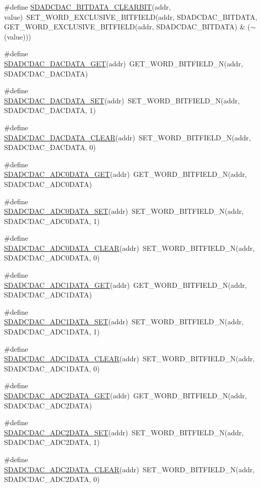 \begin{DoxyCompactItemize}
\item 
\#define \hyperlink{a00568_a17dc375efe6fac49a701ad12cfa22fe7}{SDADCDAC\_\-BITDATA\_\-CLEARBIT}(addr, value)~SET\_\-WORD\_\-EXCLUSIVE\_\-BITFIELD(addr, SDADCDAC\_\-BITDATA, GET\_\-WORD\_\-EXCLUSIVE\_\-BITFIELD(addr, SDADCDAC\_\-BITDATA) \& ($\sim$(value)))
\item 
\#define \hyperlink{a00568_ac2910c55e1df33349ca3c6434fa9fb16}{SDADCDAC\_\-DACDATA\_\-GET}(addr)~GET\_\-WORD\_\-BITFIELD\_\-N(addr, SDADCDAC\_\-DACDATA)
\item 
\#define \hyperlink{a00568_adedd78e53866f33ac81b4bff97e960c1}{SDADCDAC\_\-DACDATA\_\-SET}(addr)~SET\_\-WORD\_\-BITFIELD\_\-N(addr, SDADCDAC\_\-DACDATA, 1)
\item 
\#define \hyperlink{a00568_a8b025dc295156c4cbfd9559f69834a82}{SDADCDAC\_\-DACDATA\_\-CLEAR}(addr)~SET\_\-WORD\_\-BITFIELD\_\-N(addr, SDADCDAC\_\-DACDATA, 0)
\item 
\#define \hyperlink{a00568_ad6fd3b0df8eb3a645f4d1e1c483158ae}{SDADCDAC\_\-ADC0DATA\_\-GET}(addr)~GET\_\-WORD\_\-BITFIELD\_\-N(addr, SDADCDAC\_\-ADC0DATA)
\item 
\#define \hyperlink{a00568_ad4b8c7c01bc86df47126393f241001fd}{SDADCDAC\_\-ADC0DATA\_\-SET}(addr)~SET\_\-WORD\_\-BITFIELD\_\-N(addr, SDADCDAC\_\-ADC0DATA, 1)
\item 
\#define \hyperlink{a00568_a3fbf4da7eaefbae8b936edf282910f7b}{SDADCDAC\_\-ADC0DATA\_\-CLEAR}(addr)~SET\_\-WORD\_\-BITFIELD\_\-N(addr, SDADCDAC\_\-ADC0DATA, 0)
\item 
\#define \hyperlink{a00568_a4b5991dcb76953f7237472cffcab8772}{SDADCDAC\_\-ADC1DATA\_\-GET}(addr)~GET\_\-WORD\_\-BITFIELD\_\-N(addr, SDADCDAC\_\-ADC1DATA)
\item 
\#define \hyperlink{a00568_a36d224b76aa0a1e73354f5ea15c3e1c1}{SDADCDAC\_\-ADC1DATA\_\-SET}(addr)~SET\_\-WORD\_\-BITFIELD\_\-N(addr, SDADCDAC\_\-ADC1DATA, 1)
\item 
\#define \hyperlink{a00568_a73dd1e87c7150a2e5a9f07c9b47a02c4}{SDADCDAC\_\-ADC1DATA\_\-CLEAR}(addr)~SET\_\-WORD\_\-BITFIELD\_\-N(addr, SDADCDAC\_\-ADC1DATA, 0)
\item 
\#define \hyperlink{a00568_ae50b5cb44f8d5ce85d26e17c98a0170b}{SDADCDAC\_\-ADC2DATA\_\-GET}(addr)~GET\_\-WORD\_\-BITFIELD\_\-N(addr, SDADCDAC\_\-ADC2DATA)
\item 
\#define \hyperlink{a00568_af7010979594ff3aaa27ac860f0ca99fa}{SDADCDAC\_\-ADC2DATA\_\-SET}(addr)~SET\_\-WORD\_\-BITFIELD\_\-N(addr, SDADCDAC\_\-ADC2DATA, 1)
\item 
\#define \hyperlink{a00568_a5fcecfbef7f667a616612a2fd372b4df}{SDADCDAC\_\-ADC2DATA\_\-CLEAR}(addr)~SET\_\-WORD\_\-BITFIELD\_\-N(addr, SDADCDAC\_\-ADC2DATA, 0)

\end{DoxyCompactItemize}
